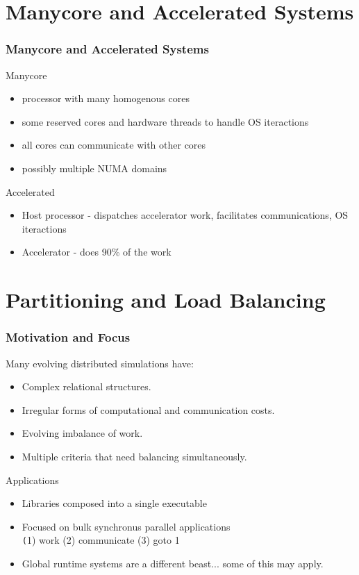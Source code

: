 \documentclass[aspectratio=169]{beamer}
\begin{document}
\section{Manycore and Accelerated Systems}
\begin{frame}
  \frametitle{Manycore and Accelerated Systems}
  Manycore
  \begin{itemize}
    \item processor with many homogenous cores
    \item some reserved cores and hardware threads to handle OS iteractions
    \item all cores can communicate with other cores
    \item possibly multiple NUMA domains
  \end{itemize}
  Accelerated
  \begin{itemize}
    \item Host processor - dispatches accelerator work, facilitates
      communications, OS iteractions
    \item Accelerator - does 90\% of the work
  \end{itemize}
\end{frame}

\section{Partitioning and Load Balancing}
\begin{frame}
  \frametitle{Motivation and Focus}
  Many evolving distributed simulations have: \\
  \begin{itemize}
    \item Complex relational structures.
    \item Irregular forms of computational and communication costs.
    \item Evolving imbalance of work. %
    \item Multiple criteria that need balancing simultaneously.
  \end{itemize}
  Applications
  \begin{itemize}
    \item Libraries composed into a single executable
    \item Focused on bulk synchronus parallel applications \\
      {\small \texttt (1) work (2) communicate (3) goto 1}
    \item Global runtime systems are a different beast... some of this may apply.
  \end{itemize}
\end{frame}
\end{document}
